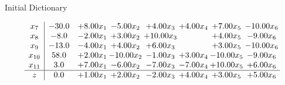 \documentclass[8pt]{article}
\begin{document}
Initial Dictionary 

\[\begin{array}{c| c c@{\hskip 2pt} c@{\hskip 2pt} c@{\hskip 2pt} c@{\hskip 2pt} c@{\hskip 2pt} c@{\hskip 2pt} }
 x_{7}   &  -30.0 & +  8.00 x_{1} & -5.00 x_{2} & +  4.00 x_{3} & +  4.00 x_{4} & +  7.00 x_{5} & -10.00 x_{6}\\
 x_{8}   &  -8.0 & -2.00 x_{1} & +  3.00 x_{2} & + 10.00 x_{3} &   & +  4.00 x_{5} & -9.00 x_{6}\\
 x_{9}   &  -13.0 & -4.00 x_{1} & +  4.00 x_{2} & +  6.00 x_{3} &   & +  3.00 x_{5} & -10.00 x_{6}\\
 x_{10}   &  58.0 & +  2.00 x_{1} & -10.00 x_{2} & -1.00 x_{3} & +  3.00 x_{4} & -10.00 x_{5} & -9.00 x_{6}\\
 x_{11}   &  3.0 & +  7.00 x_{1} & -6.00 x_{2} & -7.00 x_{3} & -7.00 x_{4} & + 10.00 x_{5} & +  6.00 x_{6}\\
\hline
z    &  0.0 & +  1.00 x_{1} & +  2.00 x_{2} & -2.00 x_{3} & +  4.00 x_{4} & +  3.00 x_{5} & +  5.00 x_{6}\\
\end{array}\]
\end{document}
